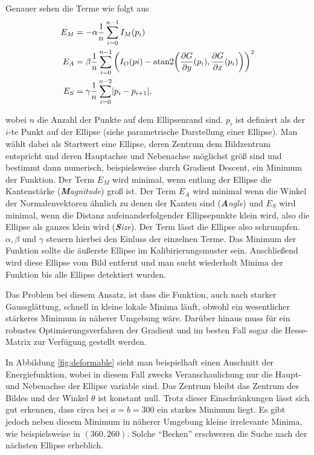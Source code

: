 Genauer sehen die Terme wie folgt aus
\begin{equation*}
\begin{aligned}
E_M &= -\alpha\frac{1}{n}\sum_{i=0}^{n-1}I_M(p_i) \\
E_A &= \beta\frac{1}{n}\sum_{i=0}^{n-1}\left(I_O(pi) - \text{atan2}{\left(\frac{\partial G}{\partial y}(p_i), \frac{\partial G}{\partial x}(p_i)\right)}\right)^2 \\
E_S &= \gamma\frac{1}{n}\sum_{i=0}^{n-2}\lvert p_i - p_{i+1}\rvert,
\end{aligned}
\end{equation*}

wobei $n$ die Anzahl der Punkte auf dem Ellipsenrand sind. $p_i$ ist definiert als der $i$-te Punkt auf der Ellipse (siehe parametrische Darstellung einer Ellipse).
Man wählt dabei als Startwert eine Ellipse, deren Zentrum dem Bildzentrum entspricht und deren Hauptachse und Nebenachse möglichst größ sind und bestimmt dann numerisch, beispielsweise durch Gradient Descent, ein Minimum der Funktion. Der Term $E_M$ wird minimal, wenn entlang der Ellipse die Kantenstärke (\textit{\textbf{M}agnitude}) groß ist. Der Term $E_A$ wird minimal wenn die Winkel der Normalenvektoren ähnlich zu denen der Kanten sind (\textit{\textbf{A}ngle}) und $E_S$ wird minimal, wenn die Distanz aufeinanderfolgender Ellipsepunkte klein wird, also die Ellipse als ganzes klein wird (\textit{\textbf{S}ize}). Der Term lässt die Ellipse also schrumpfen. $\alpha, \beta$ und $\gamma$ steuern hierbei den Einluss der einzelnen Terme. Das Minimum der Funktion sollte die äußerste Ellipse im Kalibirierungsmuster sein. Anschließend wird diese Ellipse vom Bild entfernt und man sucht wiederholt Minima der Funktion bis alle Ellipse detektiert wurden. 

Das Problem bei diesem Ansatz, ist dass die Funktion, auch nach starker Gaussglättung, schnell in kleine lokale Minima läuft, obwohl ein wesentlicher stärkeres Minimum in näherer Umgebung wäre. Darüber hinaus muss für ein robustes Optimierungsverfahren der Gradient und im besten Fall sogar die Hesse-Matrix zur Verfügung gestellt werden. 

In Abbildung \ref{fig:deformable} sieht man beispielhaft einen Auschnitt der Energiefunktion, wobei in diesem Fall zwecks Veranschaulichung nur die Haupt- und Nebenachse der Ellipse variable sind. Das Zentrum bleibt das Zentrum des Bildes und der Winkel $\theta$ ist konstant null. Trotz dieser Einschränkungen lässt sich gut erkennen, dass circa bei $a = b = 300$ ein starkes Minimum liegt. Es gibt jedoch neben diesem Minimum in näherer Umgebung kleine irrelevante Minima, wie beispielsweise in $(360, 260)$. Solche "`Becken"' erschweren die Suche nach der nächsten Ellipse erheblich.


